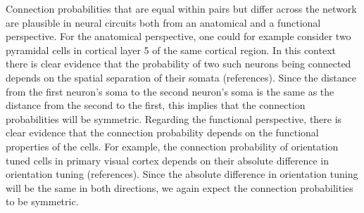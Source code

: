 


Connection probabilities that are equal within pairs but differ across the network are plausible in neural circuits both from an anatomical and a functional perspective. For the anatomical perspective, one could for example consider two pyramidal cells in cortical layer 5 of the same cortical region. In this context there is clear evidence that the probability of two such neurons being connected depends on the spatial separation of their somata (references). Since the distance from the first neuron's soma to the second neuron's soma is the same as the distance from the second to the first, this implies that the connection probabilities will be symmetric. Regarding the functional perspective, there is clear evidence that the connection probability depends on the functional properties of the cells. For example, the connection probability of orientation tuned cells in primary visual cortex depends on their absolute difference in orientation tuning (references). Since the absolute difference in orientation tuning will be the same in both directions, we again expect the connection probabilities to be symmetric.

